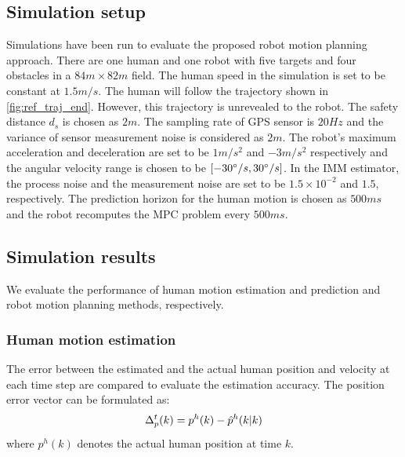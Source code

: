 \documentclass[letterpaper, 10 pt, conference]{ieeeconf}
\begin{document}
	\subsection{Simulation setup}
	Simulations have been run to evaluate the proposed robot motion planning approach. 
	There are one human and one robot with five targets and four obstacles in a $84 m\times 82 m$ field. 
	The human speed in the simulation is set to be constant at $1.5m/s$. 
	The human will follow the trajectory shown in \cref{fig:ref_traj_end}.
	However, this trajectory is unrevealed to the robot.
	The safety distance $d_s$ is chosen as $2m$.
	The sampling rate of GPS sensor is $20Hz$ and the variance of sensor measurement noise is considered as $2m$. 
	The robot's maximum acceleration and deceleration are set to be $1 m/s^2$ and $-3 m/s^2$ respectively and the angular velocity range is chosen to be $[-30\degree/s,30\degree/s]$.
	In the IMM estimator, the process noise and the measurement noise are set to be $1.5\times 10^{-2}$ and $1.5$, respectively.
	The prediction horizon for the human motion is chosen as $500ms$ and the robot recomputes the MPC problem every $500ms$.
	
	\subsection{Simulation results}
	We evaluate the performance of human motion estimation and prediction and robot motion planning methods, respectively.
	\subsubsection{Human motion estimation}\label{subsubsec:motion_est}
	The error between the estimated and the actual human position and velocity at each time step are compared to evaluate the estimation accuracy.
	The position error vector can be formulated as:
	\[
	\Delta^{t}_p(k)=p^h(k)-\hat{p}^h(k|k)\label{eqn:track_err_pos}\\
	\]
	where $p^h(k)$ denotes the actual human position at time $k$. 
	
	
	
	
\end{document}
